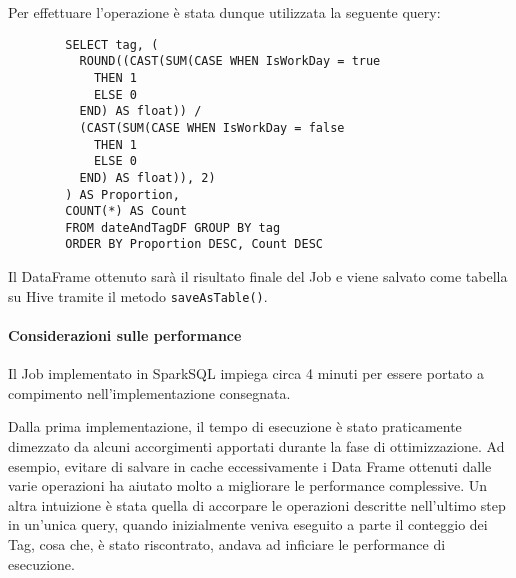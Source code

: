 \begin{itemize}
      Per effettuare l'operazione è stata dunque utilizzata la seguente query:

      \begin{verbatim}
        SELECT tag, (
          ROUND((CAST(SUM(CASE WHEN IsWorkDay = true
            THEN 1
            ELSE 0
          END) AS float)) /
          (CAST(SUM(CASE WHEN IsWorkDay = false
            THEN 1
            ELSE 0
          END) AS float)), 2)
        ) AS Proportion,
        COUNT(*) AS Count
        FROM dateAndTagDF GROUP BY tag
        ORDER BY Proportion DESC, Count DESC
      \end{verbatim}

    Il DataFrame ottenuto sarà il risultato finale del Job
    e viene salvato come tabella su Hive tramite il metodo \texttt{saveAsTable()}.
  \end{itemize}

  \paragraph{Considerazioni sulle performance}\label{par:job1:spark:performance}

  Il Job implementato in SparkSQL impiega circa 4 minuti per essere portato a compimento nell'implementazione consegnata.

  Dalla prima implementazione, il tempo di esecuzione è stato praticamente dimezzato da alcuni accorgimenti apportati durante la fase di ottimizzazione.
  Ad esempio, evitare di salvare in cache eccessivamente i Data Frame ottenuti dalle varie operazioni ha aiutato molto a migliorare le performance complessive.
  Un altra intuizione è stata quella di accorpare le operazioni descritte nell'ultimo step in un'unica query, quando inizialmente
  veniva eseguito a parte il conteggio dei Tag, cosa che, è stato riscontrato, andava ad inficiare le performance di esecuzione.
